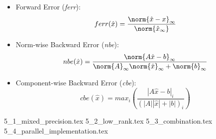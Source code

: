\begin{itemize}
    \item Forward Error (\textit{ferr}):
    \begin{equation}
        ferr(\hat{x}) = \frac{\norm{\hat{x}-x}_\infty}{\norm{\hat{x}_\infty}}
    \end{equation}
    \item Norm-wise Backward Error (\textit{nbe}):
    \begin{equation}
        nbe(\hat{x}) = \frac{\norm{A\hat{x}-b}_\infty}{\norm{A}_\infty\norm{\hat{x}}_\infty+\norm{b}_\infty}
    \end{equation}
    \item Component-wise Backward Error (\textit{cbe}):
    \begin{equation}
        cbe(\hat{x}) = max_i \left(\frac{|A\hat{x}-b|_i}{(|A||\hat{x}|+|b|)_i}\right)
    \end{equation}
\end{itemize}





{5_1_mixed_precision.tex}
{5_2_low_rank.tex}
{5_3_combination.tex}
{5_4_parallel_implementation.tex}